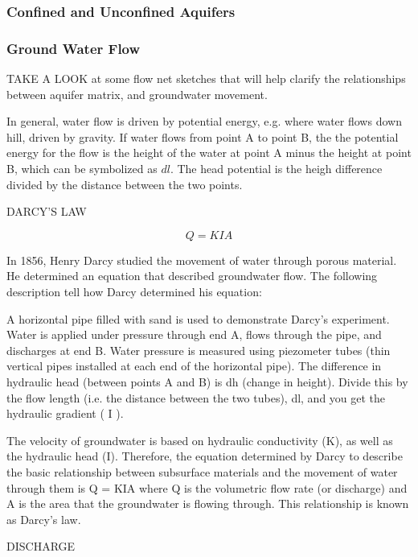 \documentclass{book}\usepackage{knitr}
\begin{document}
\subsubsection{Confined and Unconfined Aquifers}

\subsubsection{Ground Water Flow}

TAKE A LOOK at some flow net sketches that will help clarify the relationships between aquifer matrix, and groundwater movement.

In general, water flow is driven by potential energy, e.g.  where water flows down hill, driven by gravity. If water flows from point A to point B, the the potential energy for the flow is the height of the water at point A minus the height at point B, which can be symbolized as $dl$. The head potential is the heigh difference divided by the distance between the two points.  

DARCY'S LAW

\begin{equation}
Q = KIA
\end{equation}

In 1856, Henry Darcy studied the movement of water through porous material. He determined an equation that described groundwater flow. The following description tell how Darcy determined his equation:

A horizontal pipe filled with sand is used to demonstrate Darcy's experiment. Water is applied under pressure through end A, flows through the pipe, and discharges at end B. Water pressure is measured using piezometer tubes (thin vertical pipes installed at each end of the horizontal pipe). The difference in hydraulic head (between points A and B) is dh (change in height). Divide this by the flow length (i.e. the distance between the two tubes), dl, and you get the hydraulic gradient ( I ).

The velocity of groundwater is based on hydraulic conductivity (K), as well as the hydraulic head (I). Therefore, the equation determined by Darcy to describe the basic relationship between subsurface materials and the movement of water through them is Q = KIA where Q is the volumetric flow rate (or discharge) and A is the area that the groundwater is flowing through. This relationship is known as Darcy’s law.

DISCHARGE
\end{document}
